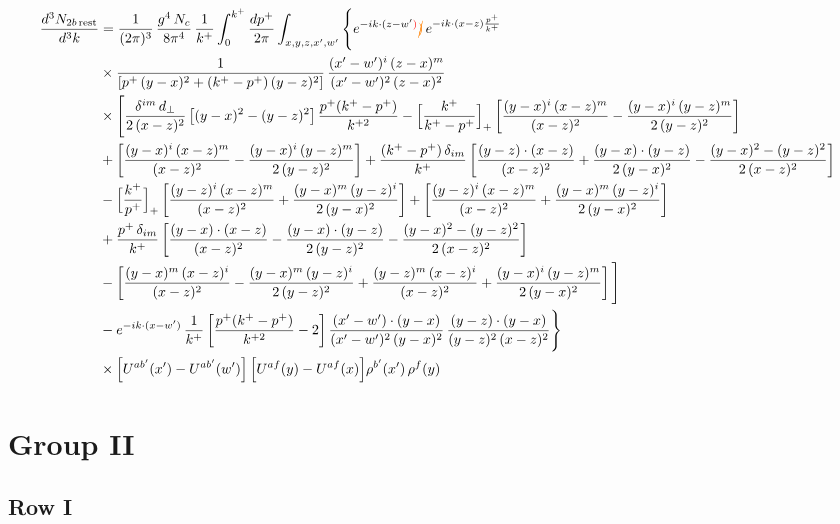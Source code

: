 \documentclass[9pt]{article}
\numberwithin{equation}{section}
\begin{document}
\begin{align}
\frac{d^{3}N_{2b\,\rm rest}}{d^{3}k} & =\frac{1}{(2\pi)^{3}}\,\frac{g^{4}\,N_{c}}{8\pi^{4}}\,\frac{1}{k^{+}}\int_{0}^{k^{+}}\frac{dp^{+}}{2\pi}\int_{x,y,z,x',w'}\Bigg\{e^{-ik\cdot(z-w'{\color{red})}}{\color{orange}\cancel{)}}\,e^{-ik\cdot(x-z)\frac{p^{+}}{k^{+}}}\notag \\ & \times\frac{1}{\left[p^{+}\,(y-x)^{2}+(k^{+}-p^{+})\,(y-z)^{2}\right]}\,\frac{(x'-w')^{i}\,(z-x)^{m}}{(x'-w')^{2}\,(z-x)^{2}}\notag\\
&\times\Bigg[\frac{\delta^{im}\,d_{\perp}}{2\,(x-z)^{2}}\left[(y-x)^{2}-(y-z)^{2}\right]\frac{p^{+}(k^{+}-p^{+})}{k^{+2}}
-\Big[\frac{k^{+}}{k^{+}-p^{+}}\Big]_{+}\left[\frac{(y-x)^{i}\,(x-z)^{m}}{(x-z)^{2}}-\frac{(y-x)^{i}\,(y-z)^{m}}{2\,(y-z)^{2}}\right]\notag\\
&+\left[\frac{(y-x)^{i}\,(x-z)^{m}}{(x-z)^{2}}-\frac{(y-x)^{i}\,(y-z)^{m}}{2\,(y-z)^{2}}\right]
+\frac{(k^{+}-p^{+})\,\delta_{im}}{k^{+}}\left[\frac{(y-z)\cdot(x-z)}{(x-z)^{2}}+\frac{(y-x)\cdot(y-z)}{2\,(y-x)^{2}}-\frac{(y-x)^{2}-(y-z)^{2}}{2\,(x-z)^{2}}\right]\notag\\
&-\Big[\frac{k^{+}}{p^{+}}\Big]_{+}\left[\frac{(y-z)^{i}\,(x-z)^{m}}{(x-z)^{2}}+\frac{(y-x)^{m}\,(y-z)^{i}}{2\,(y-x)^{2}}\right]+\left[\frac{(y-z)^{i}\,(x-z)^{m}}{(x-z)^{2}}+\frac{(y-x)^{m}\,(y-z)^{i}}{2\,(y-x)^{2}}\right]\notag\\
&+\frac{p^{+}\,\delta_{im}}{k^{+}}\left[\frac{(y-x)\cdot(x-z)}{(x-z)^{2}}-\frac{(y-x)\cdot(y-z)}{2\,(y-z)^{2}}-\frac{(y-x)^{2}-(y-z)^{2}}{2\,(x-z)^{2}}\right]\notag\\
&-\left[\frac{(y-x)^{m}\,(x-z)^{i}}{(x-z)^{2}}-\frac{(y-x)^{m}\,(y-z)^{i}}{2\,(y-z)^{2}}+\frac{(y-z)^{m}\,(x-z)^{i}}{(x-z)^{2}}+\frac{(y-x)^{i}\,(y-z)^{m}}{2\,(y-x)^{2}}\right]\Bigg]\notag\\
&-e^{-ik\cdot(x-w')}\,\frac{1}{k^{+}}\left[\frac{p^{+}(k^{+}-p^{+})}{k^{+2}}-2\right]\frac{(x'-w')\cdot(y-x)}{(x'-w')^{2}\,(y-x)^{2}}\,\frac{(y-z)\cdot(y-x)}{(y-z)^{2}\,(x-z)^{2}}\Bigg\}\notag\\
&\times\Big[U^{ab'}(x')-U^{ab'}(w')\Big]\,\Big[U^{af}(y)-U^{af}(x)\Big]\rho^{b'}(x')\,\rho^{f}(y)
\end{align}
\section{Group II}
\subsection{Row I}
\end{document}
